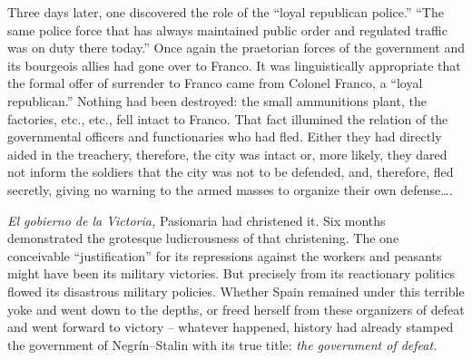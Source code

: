 Three days later, one discovered the role of the ``loyal republican police.'' ``The same police force that has always maintained public order and regulated traffic was on duty there today.'' Once again the praetorian forces of the government and its bourgeois allies had gone over to Franco. It was linguistically appropriate that the formal offer of surrender to Franco came from Colonel Franco, a ``loyal republican.'' Nothing had been destroyed: the small ammunitions plant, the factories, etc., etc., fell intact to Franco. That fact illumined the relation of the governmental officers and functionaries who had fled. Either they had directly aided in the treachery, therefore, the city was intact or, more likely, they dared not inform the soldiers that the city was not to be defended, and, therefore, fled secretly, giving no warning to the armed masses to organize their own defense\dots.

\emph{El gobierno de la Victoria,} Pasionaria had christened it. Six months demonstrated the grotesque ludicrousness of that christening. The one conceivable ``justification'' for its repressions against the workers and peasants might have been its military victories. But precisely from its reactionary politics flowed its disastrous military policies. Whether Spain remained under this terrible yoke and went down to the depths, or freed herself from these organizers of defeat and went forward to victory – whatever happened, history had already stamped the government of Negr\'in--Stalin with its true title: \emph{the government of defeat.}